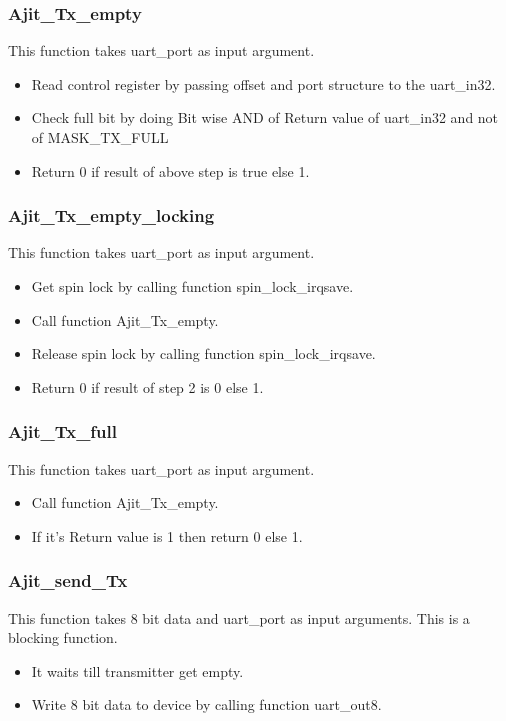 \documentclass[12pt,a4paper]{article}
\begin{document}
\subsubsection{Ajit\_Tx\_empty}
This function takes uart\_port as input argument.
\begin{itemize}
\item Read control register by passing offset and port structure to the uart\_in32. 
\item Check full bit by doing Bit wise AND of Return value of uart\_in32 and not of MASK\_TX\_FULL
\item Return 0 if result of above step is true else 1.   
\end{itemize}
\subsubsection{Ajit\_Tx\_empty\_locking}
This function takes uart\_port as input argument.
\begin{itemize}
\item Get spin lock by calling function spin\_lock\_irqsave. 
\item Call function Ajit\_Tx\_empty.
\item Release spin lock by calling function spin\_lock\_irqsave. 
\item Return 0 if result of step 2 is 0 else 1.  
\end{itemize}

\subsubsection{Ajit\_Tx\_full}
This function takes uart\_port as input argument.
\begin{itemize}
\item Call function Ajit\_Tx\_empty. 
\item If it's Return value is 1 then return 0 else 1.  
\end{itemize}

\subsubsection{Ajit\_send\_Tx}
This function takes 8 bit data and uart\_port as input arguments.
This is a blocking function.
\begin{itemize}
\item It waits till transmitter get empty. 
\item Write 8 bit data to device by calling function uart\_out8.  
\end{itemize}
\end{document}

